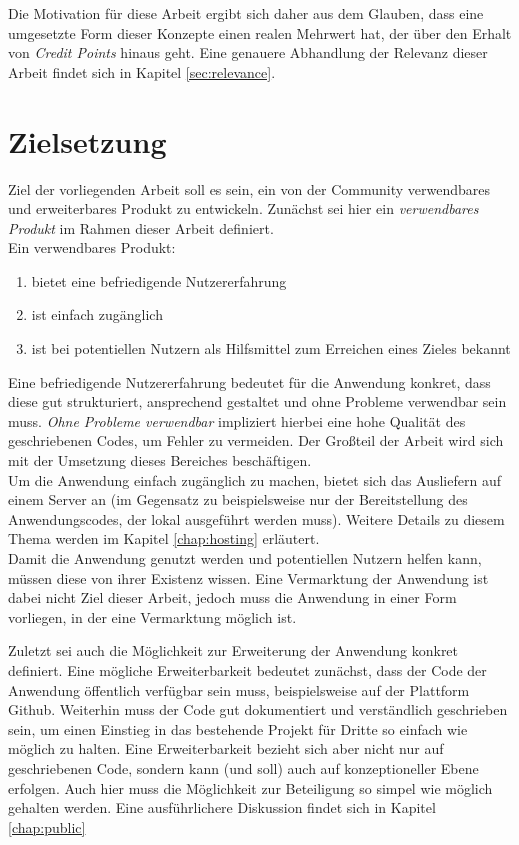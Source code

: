 Die Motivation für diese Arbeit ergibt sich daher aus dem Glauben, dass eine umgesetzte Form dieser Konzepte einen realen Mehrwert hat, der über den Erhalt von \textit{Credit Points} hinaus geht.
Eine genauere Abhandlung der Relevanz dieser Arbeit findet sich in Kapitel \ref{sec:relevance}.

\section{Zielsetzung}
\label{chap:goal}
Ziel der vorliegenden Arbeit soll es sein, ein von der Community verwendbares und erweiterbares Produkt zu entwickeln. Zunächst sei hier ein \textit{verwendbares Produkt} im Rahmen dieser Arbeit definiert.\\
Ein verwendbares Produkt:

\begin{enumerate}
  \item bietet eine befriedigende Nutzererfahrung
  \item ist einfach zugänglich
  \item ist bei potentiellen Nutzern als Hilfsmittel zum Erreichen eines Zieles bekannt
\end{enumerate}

Eine befriedigende Nutzererfahrung bedeutet für die Anwendung konkret, dass diese gut strukturiert, ansprechend gestaltet und ohne Probleme verwendbar sein muss. \textit{Ohne Probleme verwendbar} impliziert hierbei eine hohe Qualität des geschriebenen Codes, um Fehler zu vermeiden. Der Großteil der Arbeit wird sich mit der Umsetzung dieses Bereiches beschäftigen.\\
Um die Anwendung einfach zugänglich zu machen, bietet sich das Ausliefern auf einem Server an (im Gegensatz zu beispielsweise nur der Bereitstellung des Anwendungscodes, der lokal ausgeführt werden muss). Weitere Details zu diesem Thema werden im Kapitel \ref{chap:hosting} erläutert.\\
Damit die Anwendung genutzt werden und potentiellen Nutzern helfen kann, müssen diese von ihrer Existenz wissen. Eine Vermarktung der Anwendung ist dabei nicht Ziel dieser Arbeit, jedoch muss die Anwendung in einer Form vorliegen, in der eine Vermarktung möglich ist.

Zuletzt sei auch die Möglichkeit zur Erweiterung der Anwendung konkret definiert. Eine mögliche Erweiterbarkeit bedeutet zunächst, dass der Code der Anwendung öffentlich verfügbar sein muss, beispielsweise auf der Plattform Github\footnotemark{}. Weiterhin muss der Code gut dokumentiert und verständlich geschrieben sein, um einen Einstieg in das bestehende Projekt für Dritte so einfach wie möglich zu halten. Eine Erweiterbarkeit bezieht sich aber nicht nur auf geschriebenen Code, sondern kann (und soll) auch auf konzeptioneller Ebene erfolgen. Auch hier muss die Möglichkeit zur Beteiligung so simpel wie möglich gehalten werden. Eine ausführlichere Diskussion findet sich in Kapitel \ref{chap:public}\\

